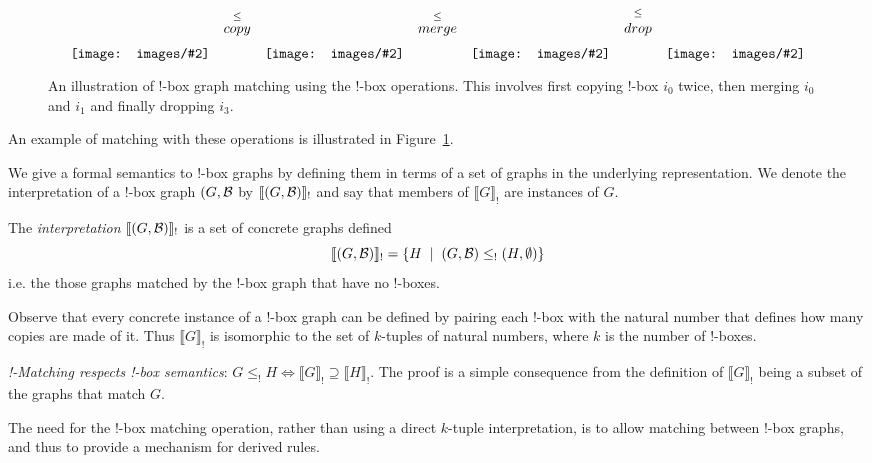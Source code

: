 \documentclass[runningheads]{llncs}
\newcommand{\binterp}[1]{\llbracket #1 \rrbracket_!}
\newcommand{\inlinegraphic}[2]{
  \dimendef\grafheight=255\dimendef\grafvshift=254
  \grafheight=#1
  \grafvshift=-0.5\grafheight
  \advance\grafvshift by 0.5ex
  \raisebox{\grafvshift}{\texttt{[image: images/\#2]}\xspace}
}
\begin{document}
\begin{figure}[t]
$$\begin{array}{ccccccc}
\inlinegraphic{4em}{bbox-ex1} &  
\stackrel{\leq}{\stackrel{\ }{\small{copy}}} 
& \inlinegraphic{4em}{bbox-ex2}  & 
\stackrel{\leq}{\stackrel{\ }{\small{merge}}} 
& \inlinegraphic{4em}{bbox-ex3}  & 
\stackrel{\leq}{\stackrel{\ }{\small{drop}}} 
& \inlinegraphic{4em}{bbox-ex4}
\end{array}$$ 
\label{fig:bang-box-example}\caption{An illustration of !-box graph
  matching using the !-box operations. This involves first copying
  !-box $i_0$ twice, then merging $i_0$ and $i_1$ and finally dropping
  $i_3$.}
\end{figure}
 
An example of matching with these operations is illustrated in
Figure~\ref{fig:bang-box-example}.

We give a formal semantics to !-box graphs by defining them in terms
of a set of graphs in the underlying representation. We denote the
interpretation of a !-box graph $(G,{\cal B}$ by $\binterp{(G,{\cal
    B})}$ and say that members of $\binterp{G}$ are instances of $G$. 

\begin{definition}
  The \emph{interpretation} $\binterp{(G,{\cal B})}$ is a
  set of concrete graphs defined 
  \[
  \binterp{(G,{\cal B})} = \{ H \;\;|\;\; (G,{\cal B}) \leq_! (H,\emptyset) \}
  \]
  i.e. the those graphs matched by the !-box graph that have no
  !-boxes.
\end{definition}

Observe that every concrete instance of a !-box graph can be defined
by pairing each !-box with the natural number that defines how many
copies are made of it. Thus $\binterp{G}$ is isomorphic to the set of
$k$-tuples of natural numbers, where $k$ is the number of !-boxes. 

\begin{proposition}
\label{thm:bang-box-respect}
\emph{!-Matching respects !-box semantics}: $G \leq_! H
\Leftrightarrow \binterp{G} \supseteq \binterp{H}$. The proof is a
simple consequence from the definition of $\binterp{G}$ being a subset
of the graphs that match $G$.
\end{proposition}

The need for the !-box matching operation, rather than using a direct
$k$-tuple interpretation, is to allow matching between !-box graphs,
and thus to provide a mechanism for derived rules.
\end{document}
